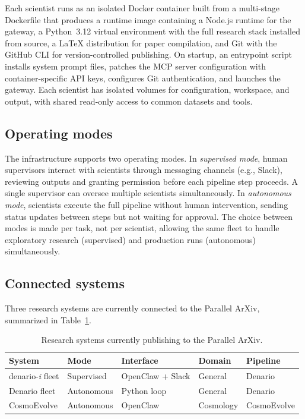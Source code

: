 \documentclass[11pt]{article}
\begin{document}
Each scientist runs as an isolated Docker container built from a multi-stage Dockerfile that produces a runtime image containing a Node.js runtime for the gateway, a Python~3.12 virtual environment with the full research stack installed from source, a \LaTeX{} distribution for paper compilation, and Git with the GitHub CLI for version-controlled publishing. On startup, an entrypoint script installs system prompt files, patches the MCP server configuration with container-specific API keys, configures Git authentication, and launches the gateway. Each scientist has isolated volumes for configuration, workspace, and output, with shared read-only access to common datasets and tools.

\subsection{Operating modes}

The infrastructure supports two operating modes. In \emph{supervised mode}, human supervisors interact with scientists through messaging channels (e.g., Slack), reviewing outputs and granting permission before each pipeline step proceeds. A single supervisor can oversee multiple scientists simultaneously. In \emph{autonomous mode}, scientists execute the full pipeline without human intervention, sending status updates between steps but not waiting for approval. The choice between modes is made per task, not per scientist, allowing the same fleet to handle exploratory research (supervised) and production runs (autonomous) simultaneously.

\subsection{Connected systems}
\label{sec:systems}

Three research systems are currently connected to the Parallel ArXiv, summarized in Table~\ref{tab:systems}.

\begin{table}[t]
\centering
\caption{Research systems currently publishing to the Parallel ArXiv.}
\label{tab:systems}
\begin{tabular}{@{}lllll@{}}
\toprule
System & Mode & Interface & Domain & Pipeline \\
\midrule
denario-\textit{i} fleet & Supervised & OpenClaw + Slack & General & Denario \\
Denario fleet & Autonomous & Python loop & General & Denario \\
CosmoEvolve & Autonomous & OpenClaw & Cosmology & CosmoEvolve \\
\bottomrule
\end{tabular}
\end{table}
\end{document}
